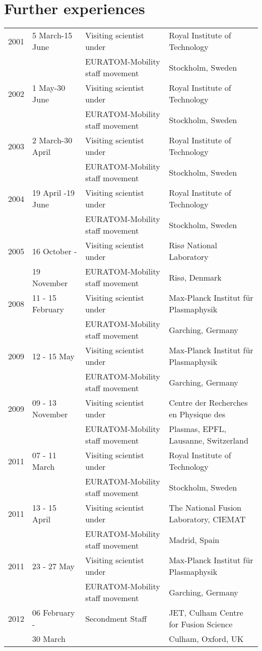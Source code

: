 \section{Further experiences}
\begin{longtable}{llll}
2001 & 5 March-15 June & Visiting scientist under& Royal Institute of
Technology\\
 & & EURATOM-Mobility
staff movement &  Stockholm, Sweden \\

2002 & 1 May-30 June & Visiting scientist under& Royal Institute of
Technology\\
 & & EURATOM-Mobility
staff movement &  Stockholm, Sweden \\
2003 & 2 March-30 April & Visiting scientist under& Royal Institute of
Technology\\
 & & EURATOM-Mobility
staff movement &  Stockholm, Sweden \\
2004 & 19 April -19 June & Visiting scientist under& Royal Institute of
Technology\\
 & & EURATOM-Mobility
staff movement &  Stockholm, Sweden \\
2005 & 16 October - & Visiting scientist under& Ris{\o}
National Laboratory\\
 & 19 November & EURATOM-Mobility
staff movement &  Ris{\o}, Denmark \\
2008 & 11 - 15 February & Visiting scientist under& Max-Planck
Institut f\"ur Plasmaphysik \\
 & & EURATOM-Mobility
staff movement &  Garching, Germany \\
2009 & 12 - 15 May & Visiting scientist under& Max-Planck
Institut f\"ur Plasmaphysik \\
 & & EURATOM-Mobility
staff movement &  Garching, Germany \\
2009 & 09 - 13 November & Visiting scientist under& Centre der
Recherches en Physique des \\
 & & EURATOM-Mobility
staff movement & Plasmas, EPFL, Lausanne, Switzerland \\
2011 & 07 - 11 March & Visiting scientist under& Royal Institute of
Technology\\
 & & EURATOM-Mobility
staff movement &  Stockholm, Sweden \\
2011 & 13 - 15 April & Visiting scientist under& The National Fusion
Laboratory, CIEMAT \\
 & & EURATOM-Mobility
staff movement &  Madrid, Spain \\
2011 & 23 - 27 May & Visiting scientist under& Max-Planck
Institut f\"ur Plasmaphysik \\
 & & EURATOM-Mobility
staff movement &  Garching, Germany \\
2012 & 06 February -  & Secondment Staff & JET, Culham Centre for
Fusion Science \\
 & 30 March & &  Culham, Oxford, UK \\
\end{longtable}

